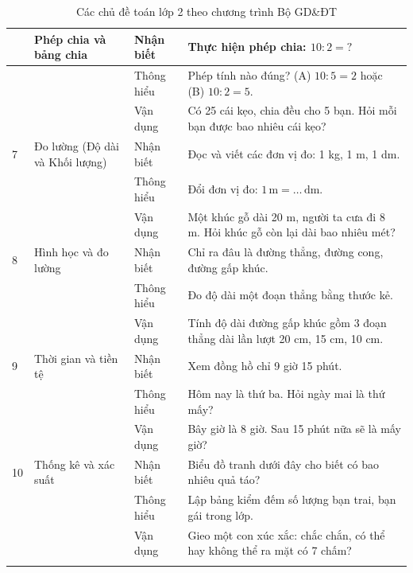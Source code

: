 \begin{longtable}{|>{\centering\arraybackslash}m{0.8cm}|m{3.5cm}|>{\centering\arraybackslash}m{2cm}|m{7.5cm}|}
	6 & Phép chia và bảng chia
	& Nhận biết & Thực hiện phép chia: $10:2=?$ \\
	\cline{3-4}
	& & Thông hiểu & Phép tính nào đúng? (A) $10:5=2$ hoặc (B) $10:2=5$. \\
	\cline{3-4}
	& & Vận dụng & Có 25 cái kẹo, chia đều cho 5 bạn. Hỏi mỗi bạn được bao nhiêu cái kẹo? \\
	\hline

	7 & Đo lường (Độ dài và Khối lượng)
	& Nhận biết & Đọc và viết các đơn vị đo: 1 kg, 1 m, 1 dm. \\
	\cline{3-4}
	& & Thông hiểu & Đổi đơn vị đo: $1\,\text{m} = \ldots\,\text{dm}$. \\
	\cline{3-4}
	& & Vận dụng & Một khúc gỗ dài 20 m, người ta cưa đi 8 m. Hỏi khúc gỗ còn lại dài bao nhiêu mét? \\
	\hline

	8 & Hình học và đo lường
	& Nhận biết & Chỉ ra đâu là đường thẳng, đường cong, đường gấp khúc. \\
	\cline{3-4}
	& & Thông hiểu & Đo độ dài một đoạn thẳng bằng thước kẻ. \\
	\cline{3-4}
	& & Vận dụng & Tính độ dài đường gấp khúc gồm 3 đoạn thẳng dài lần lượt 20 cm, 15 cm, 10 cm. \\
	\hline

	9 & Thời gian và tiền tệ
	& Nhận biết & Xem đồng hồ chỉ 9 giờ 15 phút. \\
	\cline{3-4}
	& & Thông hiểu & Hôm nay là thứ ba. Hỏi ngày mai là thứ mấy? \\
	\cline{3-4}
	& & Vận dụng & Bây giờ là 8 giờ. Sau 15 phút nữa sẽ là mấy giờ? \\
	\hline

	10 & Thống kê và xác suất
	& Nhận biết & Biểu đồ tranh dưới đây cho biết có bao nhiêu quả táo? \\
	\cline{3-4}
	& & Thông hiểu & Lập bảng kiểm đếm số lượng bạn trai, bạn gái trong lớp. \\
	\cline{3-4}
	& & Vận dụng & Gieo một con xúc xắc: chắc chắn, có thể hay không thể ra mặt có 7 chấm? \\
	\hline

	\caption{Các chủ đề toán lớp 2 theo chương trình Bộ GD\&ĐT}
	\label{tab:toan-lop2}
\end{longtable}

